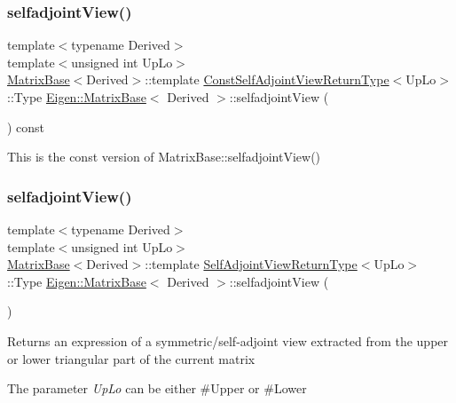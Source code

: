 \subsubsection{\texorpdfstring{selfadjointView()}{selfadjointView()}\hspace{0.1cm}{\footnotesize\ttfamily [1/2]}}
{\footnotesize\ttfamily template$<$typename Derived$>$ \\
template$<$unsigned int Up\+Lo$>$ \\
\mbox{\hyperlink{class_eigen_1_1_matrix_base}{Matrix\+Base}}$<$Derived$>$\+::template \mbox{\hyperlink{struct_eigen_1_1_matrix_base_1_1_const_self_adjoint_view_return_type}{Const\+Self\+Adjoint\+View\+Return\+Type}}$<$Up\+Lo$>$\+::Type \mbox{\hyperlink{class_eigen_1_1_matrix_base}{Eigen\+::\+Matrix\+Base}}$<$ Derived $>$\+::selfadjoint\+View (\begin{DoxyParamCaption}{ }\end{DoxyParamCaption}) const}

This is the const version of Matrix\+Base\+::selfadjoint\+View() \mbox{\label{class_eigen_1_1_matrix_base_ad446541377593656c1399862fe6a0f94}} 
\subsubsection{\texorpdfstring{selfadjointView()}{selfadjointView()}\hspace{0.1cm}{\footnotesize\ttfamily [2/2]}}
{\footnotesize\ttfamily template$<$typename Derived$>$ \\
template$<$unsigned int Up\+Lo$>$ \\
\mbox{\hyperlink{class_eigen_1_1_matrix_base}{Matrix\+Base}}$<$Derived$>$\+::template \mbox{\hyperlink{struct_eigen_1_1_matrix_base_1_1_self_adjoint_view_return_type}{Self\+Adjoint\+View\+Return\+Type}}$<$Up\+Lo$>$\+::Type \mbox{\hyperlink{class_eigen_1_1_matrix_base}{Eigen\+::\+Matrix\+Base}}$<$ Derived $>$\+::selfadjoint\+View (\begin{DoxyParamCaption}{ }\end{DoxyParamCaption})}

\begin{DoxyReturn}{Returns}
an expression of a symmetric/self-\/adjoint view extracted from the upper or lower triangular part of the current matrix
\end{DoxyReturn}
The parameter {\itshape Up\+Lo} can be either {\ttfamily \#\+Upper} or {\ttfamily \#\+Lower} 


